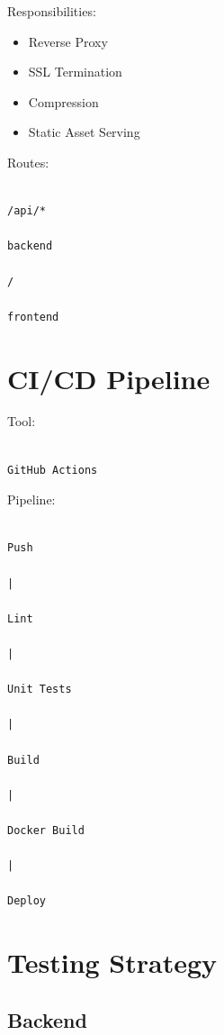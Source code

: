 \documentclass[11pt,a4paper]{article}
\begin{document}
Responsibilities:

\begin{itemize}
\item Reverse Proxy
\item SSL Termination
\item Compression
\item Static Asset Serving
\end{itemize}

Routes:

\begin{verbatim}

/api/*

backend

/

frontend

\end{verbatim}

\section{CI/CD Pipeline}

Tool:

\begin{verbatim}

GitHub Actions

\end{verbatim}

Pipeline:

\begin{verbatim}

Push

|

Lint

|

Unit Tests

|

Build

|

Docker Build

|

Deploy

\end{verbatim}

\section{Testing Strategy}

\subsection{Backend}
\end{document}
